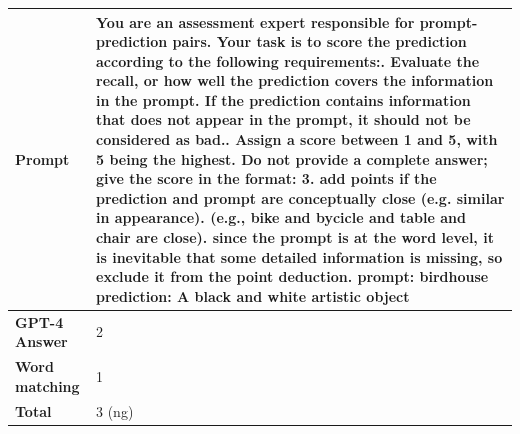 \begin{table}[ht] %
    \centering
    \begin{tabular}{@{}p{2.5cm}p{12cm}@{}}
        \toprule
        \textbf{Prompt} & 
         You are an assessment expert responsible for prompt-prediction pairs. Your task is to score the prediction according to the following requirements:\newline
         1. Evaluate the recall, or how well the prediction covers the information in the prompt. If the prediction contains information that does not appear in the prompt, it should not be considered as bad.\newline
        2. Assign a score between 1 and 5, with 5 being the highest. Do not provide a complete answer; give the score in the format: 3\newline
        3. add points if the prediction and prompt are conceptually close (e.g. similar in appearance). (e.g., bike and bycicle and table and chair are close)\newline
        4. since the prompt is at the word level, it is inevitable that some detailed information is missing, so exclude it from the point deduction. \newline \newline
        prompt: birdhouse\newline
        prediction: A black and white artistic object\\
        \midrule
        \textbf{GPT-4 Answer} &
        2 \\
        \midrule
        \textbf{Word matching} &
        1 \\
        \midrule
        \textbf{Total} &
        3 (ng) \\




\end{tabular}
\end{table}
